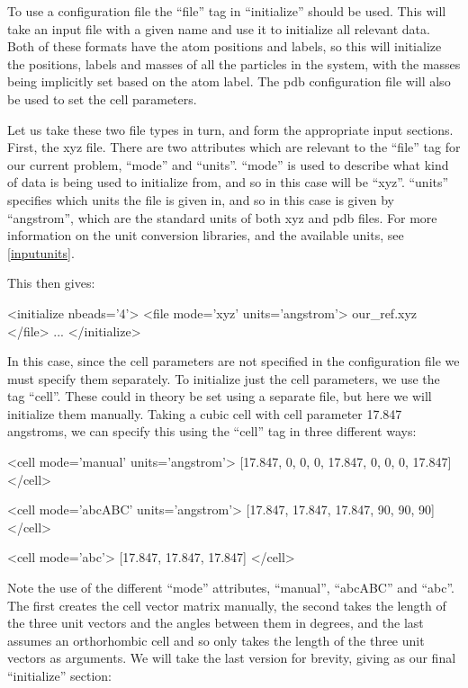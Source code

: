 \documentclass[11pt,english,fleqn]{report}
\newenvironment{code}{%
\footnotesize 
\verbatim
}{
\endverbatim
\normalsize
}
\begin{document}
To use a configuration file the {}``file'' tag in {}``initialize'' should be used.
This will take an input file with a given name and use it to initialize
all relevant data. Both of these formats have the atom
positions and labels, so this will initialize the positions, labels
and masses of all the particles in the system, with the masses being
implicitly set based on the atom label. The pdb configuration file
will also be used to set the cell parameters.

Let us take these two file types in turn, and form the appropriate
input sections. First, the xyz file. 
There are two attributes which are relevant to the {}``file'' tag
for our current problem, {}``mode'' and {}``units''.
{}``mode'' is used to describe what kind of data is being used to
initialize from, and so in this case will be {}``xyz''.
{}``units'' specifies which units the file is given in, and
so in this case is given by {}``angstrom'', which are the
standard units of both xyz and pdb files. 
For more information on the \ipi unit conversion libraries, 
and the available units, see \ref{inputunits}.

This then gives:

\begin{code}
<initialize nbeads='4'>
   <file mode='xyz' units='angstrom'> our_ref.xyz </file>
   ...
</initialize>
\end{code}

In this case, since the cell parameters are not specified in the
configuration file we must specify them separately. 
To initialize just the cell parameters, we use the tag {}``cell''.
These could in theory be set using a separate
file, but here we will initialize them manually. Taking a cubic cell
with cell parameter 17.847 angstroms, we can specify this using
the {}``cell'' tag in three different ways:

\begin{code}
<cell mode='manual' units='angstrom'> 
   [17.847, 0, 0, 0, 17.847, 0, 0, 0, 17.847] 
</cell>
\end{code}

\begin{code}
<cell mode='abcABC' units='angstrom'>
   [17.847, 17.847, 17.847, 90, 90, 90]
</cell>
\end{code}

\begin{code}
<cell mode='abc'>
   [17.847, 17.847, 17.847]
</cell>
\end{code}

Note the use of the different {}``mode'' attributes, {}``manual'',
{}``abcABC'' and {}``abc''. The first creates the cell vector
matrix manually, the second takes the length of the three unit vectors
and the angles between them in degrees, and the last assumes an orthorhombic
cell and so only takes the length of the three unit vectors as arguments.
We will take the last version for brevity, giving as our final {}``initialize''
section:
\end{document}
